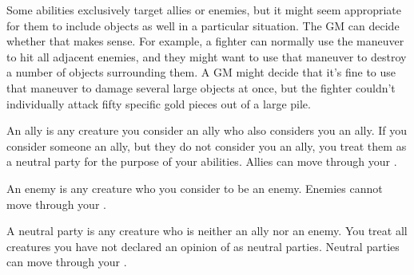         Some abilities exclusively target allies or enemies, but it might seem appropriate for them to include objects as well in a particular situation.
        The GM can decide whether that makes sense.
        For example, a fighter can normally use the  maneuver to hit all adjacent enemies, and they might want to use that maneuver to destroy a number of objects surrounding them.
        A GM might decide that it's fine to use that maneuver to damage several large objects at once, but the fighter couldn't individually attack fifty specific gold pieces out of a large pile.

         An ally is any creature you consider an ally who also considers you an ally.
        If you consider someone an ally, but they do not consider you an ally, you treat them as a neutral party for the purpose of your abilities.
        Allies can move through your .

         An enemy is any creature who you consider to be an enemy.
        Enemies cannot move through your .

         A neutral party is any creature who is neither an ally nor an enemy.
        You treat all creatures you have not declared an opinion of as neutral parties.
        Neutral parties can move through your .
